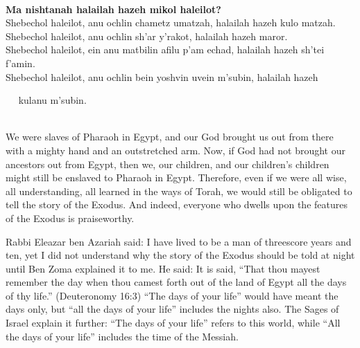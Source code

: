 \documentclass[extrafontsizes,twoside,17pt,a4paper,openany]{memoir}
\newcommand{\HgInst}[1]{{\noindent\sffamily{\bfseries{#1}}}}
\newcommand{\ch}{ch}
\newenvironment{HgEnglish}{\strut\\\noindent}{\vspace{1em}}
\newenvironment{HgTranslit}{\strut\\\noindent\begin{itshape}}{\end{itshape}\vspace{1em}}
\begin{document}
\begin{HgTranslit}
  \textbf{Ma nishtanah halailah hazeh mikol haleilot?}\\
  Shebe{\ch}ol haleilot, anu o{\ch}lin {\ch}ametz umatzah, 
  halailah hazeh kulo matzah. \\
  Shebe{\ch}ol haleilot, anu o{\ch}lin sh'ar y'rakot, 
  halailah hazeh maror. \\
  Shebe{\ch}ol haleilot, ein anu matbilin afilu p'am e{\ch}ad,
  halailah hazeh sh'tei f'amin. \\
  Shebe{\ch}ol haleilot, anu o{\ch}lin bein yoshvin uvein m'subin,
  halailah hazeh \\ \strut $\quad$ kulanu m'subin.
\end{HgTranslit}

\vfill

\newpage

\HgInst{Uncover the matzah, and read:}

\begin{HgEnglish}
We were slaves of Pharaoh in Egypt, and our God brought us out from there
with a mighty hand and an outstretched arm.
Now, if God had not brought our ancestors out from Egypt, then we, our
children, and our children's children might still be enslaved to Pharaoh in
Egypt.  Therefore, even if we were all wise, all understanding, all learned in
the ways of Torah, we would still be obligated to tell the story of the Exodus.
And indeed, everyone who dwells upon the features of the Exodus is
praiseworthy.

Rabbi Eleazar ben Azariah said: I have lived to be a man of threescore years and
ten, yet I did not understand why the story of the Exodus should be told at
night until Ben Zoma explained it to me. He said: It is said, ``That thou mayest
remember the day when thou camest forth out of the land of Egypt all the days of
thy life.'' (Deuteronomy 16:3) ``The days of your life'' would have meant the
days only, but ``all the days of your life'' includes the nights also.  The
Sages of Israel explain it further: ``The days of your life'' refers to this
world, while ``All the days of your life'' includes the time of the Messiah.

\end{HgEnglish}
\end{document}
